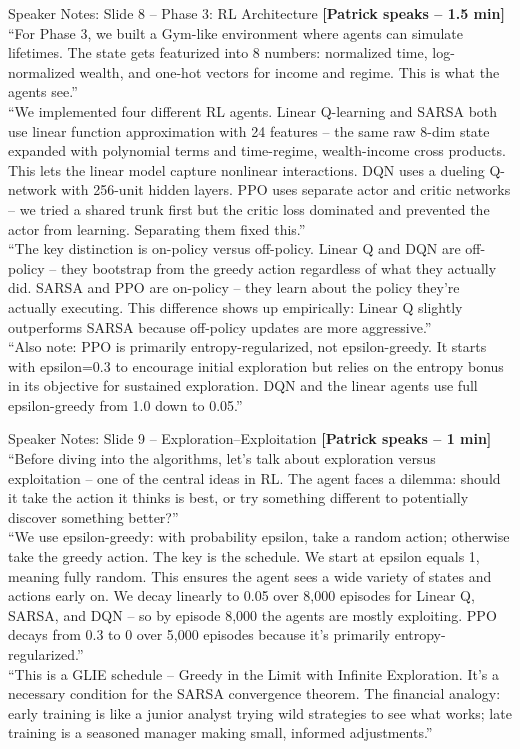 \documentclass[aspectratio=169, 11pt]{beamer}
\begin{document}
\begin{frame}[allowframebreaks]{Speaker Notes: Slide 8 -- Phase 3: RL Architecture}
\textbf{[Patrick speaks -- 1.5 min]}\\
``For Phase 3, we built a Gym-like environment where agents can simulate lifetimes. The state gets featurized into 8 numbers: normalized time, log-normalized wealth, and one-hot vectors for income and regime. This is what the agents see.''\\[0.5em]
``We implemented four different RL agents. Linear Q-learning and SARSA both use linear function approximation with 24 features -- the same raw 8-dim state expanded with polynomial terms and time-regime, wealth-income cross products. This lets the linear model capture nonlinear interactions. DQN uses a dueling Q-network with 256-unit hidden layers. PPO uses separate actor and critic networks -- we tried a shared trunk first but the critic loss dominated and prevented the actor from learning. Separating them fixed this.''\\[0.5em]
``The key distinction is on-policy versus off-policy. Linear Q and DQN are off-policy -- they bootstrap from the greedy action regardless of what they actually did. SARSA and PPO are on-policy -- they learn about the policy they're actually executing. This difference shows up empirically: Linear Q slightly outperforms SARSA because off-policy updates are more aggressive.''\\[0.5em]
``Also note: PPO is primarily entropy-regularized, not epsilon-greedy. It starts with epsilon=0.3 to encourage initial exploration but relies on the entropy bonus in its objective for sustained exploration. DQN and the linear agents use full epsilon-greedy from 1.0 down to 0.05.''
\end{frame}

\begin{frame}[allowframebreaks]{Speaker Notes: Slide 9 -- Exploration--Exploitation}
\textbf{[Patrick speaks -- 1 min]}\\
``Before diving into the algorithms, let's talk about exploration versus exploitation -- one of the central ideas in RL. The agent faces a dilemma: should it take the action it thinks is best, or try something different to potentially discover something better?''\\[0.5em]
``We use epsilon-greedy: with probability epsilon, take a random action; otherwise take the greedy action. The key is the schedule. We start at epsilon equals 1, meaning fully random. This ensures the agent sees a wide variety of states and actions early on. We decay linearly to 0.05 over 8,000 episodes for Linear Q, SARSA, and DQN -- so by episode 8,000 the agents are mostly exploiting. PPO decays from 0.3 to 0 over 5,000 episodes because it's primarily entropy-regularized.''\\[0.5em]
``This is a GLIE schedule -- Greedy in the Limit with Infinite Exploration. It's a necessary condition for the SARSA convergence theorem. The financial analogy: early training is like a junior analyst trying wild strategies to see what works; late training is a seasoned manager making small, informed adjustments.''
\end{frame}
\end{document}
